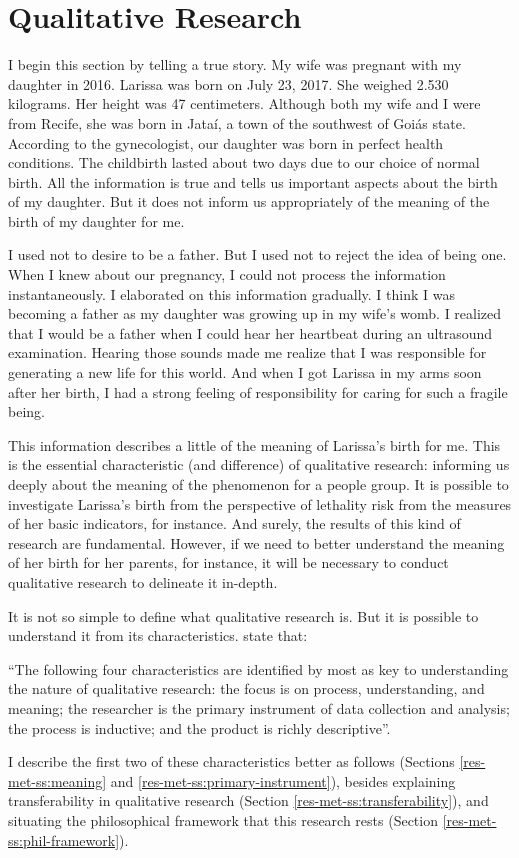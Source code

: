 \section{Qualitative Research}
\label{res-met:qualitative-research}

I begin this section by telling a true story. My wife was pregnant with my daughter in 2016. Larissa was born on July 23, 2017. She weighed 2.530 kilograms. Her height was 47 centimeters. Although both my wife and I were from Recife, she was born in Jataí, a town of the southwest of Goiás state. According to the gynecologist, our daughter was born in perfect health conditions. The childbirth lasted about two days due to our choice of normal birth. All the information is true and tells us important aspects about the birth of my daughter. But it does not inform us appropriately of the meaning of the birth of my daughter for me.

I used not to desire to be a father. But I used not to reject the idea of being one. When I knew about our pregnancy, I could not process the information instantaneously. I elaborated on this information gradually. I think I was becoming a father as my daughter was growing up in my wife's womb. I realized that I would be a father when I could hear her heartbeat during an ultrasound examination. Hearing those sounds made me realize that I was responsible for generating a new life for this world. And when I got Larissa in my arms soon after her birth, I had a strong feeling of responsibility for caring for such a fragile being. 

This information describes a little of the meaning of Larissa’s birth for me. This is the essential characteristic (and difference) of qualitative research: informing us deeply about the meaning of the phenomenon for a people group. It is possible to investigate Larissa’s birth from the perspective of lethality risk from the measures of her basic indicators, for instance. And surely, the results of this kind of research are fundamental. However, if we need to better understand the meaning of her birth for her parents, for instance, it will be necessary to conduct qualitative research to delineate it in-depth.

It is not so simple to define what qualitative research is. But it is possible to understand it from its characteristics.  state that:
\begin{citacao}
    “The following four characteristics are identified by most as key to understanding the nature of qualitative research: the focus is on process, understanding, and meaning; the researcher is the primary instrument of data collection and analysis; the process is inductive; and the product is richly descriptive”.
\end{citacao}
I describe the first two of these characteristics better as follows (Sections \ref{res-met-ss:meaning} and \ref{res-met-ss:primary-instrument}), besides explaining transferability in qualitative research (Section \ref{res-met-ss:transferability}), and situating the philosophical framework that this research rests (Section \ref{res-met-ss:phil-framework}).


